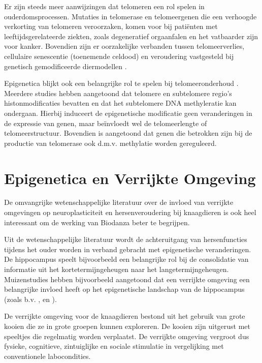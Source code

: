 \documentclass[
  11pt,
]{book}
\begin{document}
Er zijn steeds meer aanwijzingen dat telomeren een rol spelen in ouderdomsprocessen. Mutaties in telomerase en telomeergenen die een verhoogde verkorting van telomeren veroorzaken, komen voor bij patiënten met leeftijdsgerelateerde ziekten, zoals degeneratief orgaanfalen en het vatbaarder zijn voor kanker. Bovendien zijn er oorzakelijke verbanden tussen telomeerverlies, cellulaire senescentie (toenemende celdood) en veroudering vastgesteld bij genetisch gemodificeerde diermodellen \citep{Adwan2018}.

Epigenetica blijkt ook een belangrijke rol te spelen bij telomeeronderhoud \citep{Adwan2018}.
Meerdere studies hebben aangetoond dat telomere en subtelomere regio's histonmodificaties bevatten en dat het subtelomere DNA methyleratie kan ondergaan.
Hierbij induceert de epigenetische modificatie geen veranderingen in de expressie van genen, maar beïnvloedt wel de telomeerlengte of telomeerstructuur.
Bovendien is aangetoond dat genen die betrokken zijn bij de productie van telomerase ook d.m.v. methylatie worden gereguleerd.

\hypertarget{epigenetica-en-verrijkte-omgeving}{%
\section{Epigenetica en Verrijkte Omgeving}\label{epigenetica-en-verrijkte-omgeving}}

De omvangrijke wetenschappelijke literatuur over de invloed van verrijkte omgevingen op neuroplasticiteit en hersenveroudering bij knaagdieren is ook heel interessant om de werking van Biodanza beter te begrijpen.

Uit de wetenschappelijke literatuur wordt de achteruitgang van hersenfuncties tijdens het ouder worden in verband gebracht met epigenetische veranderingen. De hippocampus speelt bijvoorbeeld een belangrijke rol bij de consolidatie van informatie uit het kortetermijngeheugen naar het langetermijngeheugen. Muizenstudies hebben bijvoorbeeld aangetoond dat een verrijkte omgeving een belangrijke invloed heeft op het epigenetische landschap van de hippocampus (zoals b.v. \citet{zocher2021}, en \citet{grinan2016}).

De verrijkte omgeving voor de knaagdieren bestond uit het gebruik van grote kooien die ze in grote groepen kunnen exploreren. De kooien zijn uitgerust met speeltjes die regelmatig worden verplaatst. De verrijkte omgeving vergroot dus fysieke, cognitieve, zintuiglijke en sociale stimulatie in vergelijking met conventionele labocondities.
\end{document}
